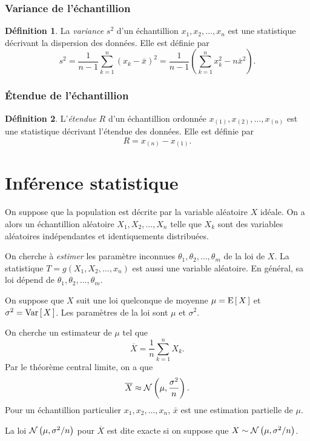 \documentclass[11pt]{article}
\makeatletter
\newcommand\Norm[2]{%
	\ensuremath{%
		\mathcal{N}\left(#1,#2\right)%
	}%
}%
\newcommand\Esp[1]{%
	\ensuremath{%
		\mathrm{E}\left[\,#1\,\right]%
	}%
}%
\newcommand\Var[1]{%
	\ensuremath{%
		\mathrm{Var}\left[\,#1\,\right]%
	}%
}%
\theoremstyle{remark}
\theoremstyle{definition}
\newtheorem*{@definition}{Définition}
\newenvironment{definition}{%
	\begin{@definition}%
}{%
	\end{@definition}%
	\setcounter{property}{0}%
}
\makeatother
\begin{document}
\subsubsection{Variance de l'échantillion}
\begin{definition}
	La \textit{variance} $s^2$ d'un échantillion $x_1,x_2,\dots,x_n$ est une
	statistique décrivant la dispersion des données. Elle est définie par
	\begin{equation*}
		s^2
		=\frac{1}{n-1}\sum_{k=1}^n\left(x_k-\bar{x}\right)^2
		=\frac{1}{n-1}\left(\sum_{k=1}^nx_k^2-n\bar{x}^2\right).
	\end{equation*}
\end{definition}

\subsubsection{Étendue de l'échantillion}
\begin{definition}
	L'\textit{étendue} $R$ d'un échantillion ordonnée $x_{(1)},x_{(2)},\dots,
	x_{(n)}$ est une statistique décrivant l'étendue des données. Elle est
	définie par
	\begin{equation*}
		R=x_{(n)}-x_{(1)}.
	\end{equation*}
\end{definition}

\section{Inférence statistique}
On suppose que la population est décrite par la variable aléatoire $X$ idéale.
On a alors un échantillion aléatoire $X_1,X_2,\dots,X_n$ telle que $X_k$ sont
des variables aléatoires indépendantes et identiquements distribuées.

On cherche à \textit{estimer} les paramètre inconnues $\theta_1,\theta_2,\dots,
\theta_m$ de la loi de $X$. La statistique $T=g(X_1,X_2,\dots,x_n)$ est aussi
une variable aléatoire. En général, sa loi dépend de $\theta_1,\theta_2,\dots,\theta_m$.

\begin{exemple}
	On suppose que $X$ suit une loi quelconque de moyenne $\mu=\Esp{X}$ et
	$\sigma^2=\Var{X}$. Les paramètres de la loi sont $\mu$ et $\sigma^2$.

	On cherche un estimateur de $\mu$ tel que
	\begin{equation*}
		\overline{X}
		=\frac{1}{n}\sum_{k=1}^nX_k.
	\end{equation*}
	Par le théorème central limite, on a que
	\begin{equation*}
		\overline{X}
		\approx\Norm{\mu}{\frac{\sigma^2}{n}}.
	\end{equation*}
	Pour un échantillion particulier $x_1,x_2,\dots,x_n$, $\bar{x}$ est une
	estimation partielle de $\mu$.

	La loi $\Norm{\mu}{\sigma^2/n}$ pour $\overline{X}$ est dite exacte si on
	suppose que $X\sim\Norm{\mu}{\sigma^2/n}$.
\end{exemple}
\end{document}
